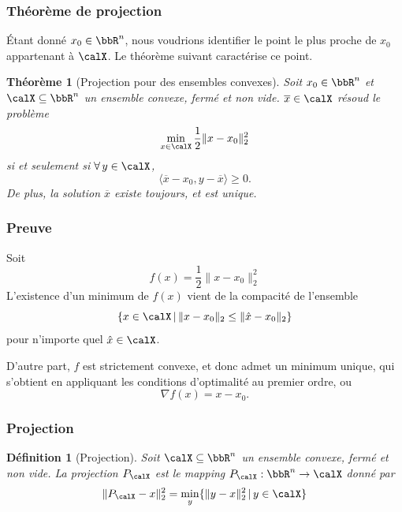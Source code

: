 \documentclass[t,aspectratio=169,usepdftitle=false]{beamer}
\newtheorem{defn}{Définition}
\newtheorem{thm}{Théorème}
\def\cX{\calX}
\begin{document}
\begin{frame}
\frametitle{Théorème de projection}

Étant donné $x_0 \in \bbR^n$, nous voudrions identifier le point le plus proche de $x_0$ appartenant à $\cX$. Le théorème suivant caractérise ce point.

\begin{thm}[Projection pour des ensembles convexes]
Soit $x_0 \in \bbR^n$ et $\cX \subseteq \bbR^n$ un ensemble convexe, fermé et non vide.
$\overline{x} \in \cX$ résoud le problème
$$
\min_{x \in \cX} \frac{1}{2} \| x - x_0 \|_2^2
$$
si et seulement si $\forall\, y \in \cX$,
$$
\langle \overline{x} - x_0, y - \overline{x} \rangle \geq 0.
$$
De plus, la solution $\overline{x}$ existe toujours, et est unique.
\end{thm}
	
\end{frame}

\begin{frame}
\frametitle{Preuve}

Soit
$$
f(x) = \frac{1}{2} \| x - x_0 \|^2_2
$$
L'existence d'un minimum de $f(x)$ vient de la compacité de l'ensemble
$$
\lbrace x \in \cX \,|\, \| x - x_0 \|_2 \leq \| \hat{x} - x_0 \|_2 \rbrace
$$
pour n'importe quel $\hat{x} \in \cX$.

\mbox{}

D'autre part, $f$ est strictement convexe, et donc admet un minimum unique, qui s'obtient en appliquant les conditions d'optimalité au premier ordre, ou
$$
\nabla f(x) = x - x_0.
$$

\end{frame}

\begin{frame}
\frametitle{Projection}

\begin{defn}[Projection]
Soit $\cX \subseteq \bbR^n$ un ensemble convexe, fermé et non vide.
La projection $P_{\cX}$ est le mapping $P_{\cX}: \bbR^n \rightarrow \cX$ donné par
$$
\| P_{\cX}-x \|_2^2 = \min_y \lbrace \| y - x \|_2^2 \,|\, y \in \cX \rbrace
$$
\end{defn}

\end{frame}
\end{document}

